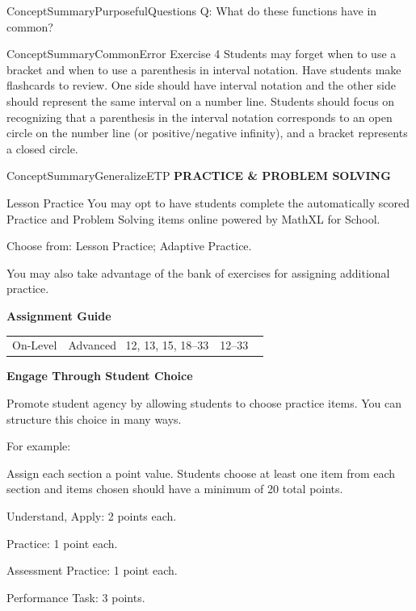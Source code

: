 \documentclass{article}
\newenvironment{te-addendum}[2]{}{}     %
\newcommand{\answer}[1]{}               %
\begin{document}
\begin{te-addendum}{ConceptSummary}{PurposefulQuestions}
Q: What do these functions have in common?
\answer{The domain of each of these functions is all real numbers. Each function has a y-intercept.}
\end{te-addendum}

\begin{te-addendum}{ConceptSummary}{CommonError}
Exercise 4 Students may forget when to use a bracket and when to use a parenthesis in interval notation. Have students make flashcards to review. One side should have interval notation and the other side should represent the same interval on a number line. Students should focus on recognizing that a parenthesis in the interval notation corresponds to an open circle on the number line (or positive/negative infinity), and a bracket represents a closed circle.
\end{te-addendum}

\begin{te-addendum}{ConceptSummary}{GeneralizeETP}
\textbf{PRACTICE & PROBLEM SOLVING}

Lesson Practice You may opt to have students complete the automatically scored Practice and Problem Solving items online powered by MathXL for School.

Choose from: Lesson Practice; Adaptive Practice.

You may also take advantage of the bank of exercises for assigning additional practice.

\textbf{Assignment Guide}
\begin{tabular}{ll}
On-Level & Advanced \
12, 13, 15, 18--33 & 12--33 \
\end{tabular}

\textbf{Engage Through Student Choice}

Promote student agency by allowing students to choose practice items. You can structure this choice in many ways.

For example:

Assign each section a point value. Students choose at least one item from each section and items chosen should have a minimum of 20 total points.

Understand, Apply: 2 points each.

Practice: 1 point each.

Assessment Practice: 1 point each.

Performance Task: 3 points.
\end{te-addendum}
\end{document}
